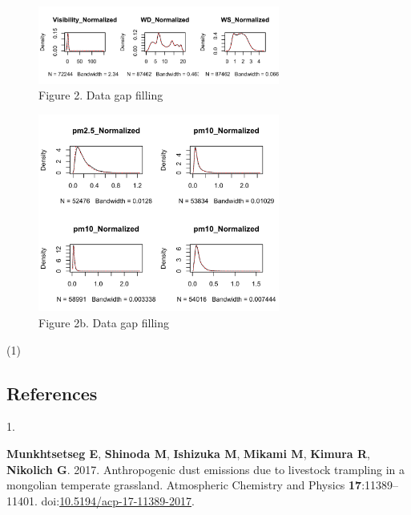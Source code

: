 \documentclass[
  11pt,
]{article}
\newlength{\cslhangindent}
\newlength{\csllabelwidth}
\newenvironment{CSLReferences}[2] %
 {\begin{list}{}{%
  \setlength{\itemindent}{0pt}
  \setlength{\leftmargin}{0pt}
  \setlength{\parsep}{0pt}
  \ifodd #1
   \setlength{\leftmargin}{\cslhangindent}
   \setlength{\itemindent}{-1\cslhangindent}
  \fi
  \setlength{\itemsep}{#2\baselineskip}}}
 {\end{list}}
\newcommand{\CSLLeftMargin}[1]{\parbox[t]{\csllabelwidth}{\strut#1\strut}}
\newcommand{\CSLRightInline}[1]{\parbox[t]{\linewidth - \csllabelwidth}{\strut#1\strut}}
\begin{document}
\newpage

\begin{figure}
\centering
\includegraphics[width=3.125in,height=\textheight,keepaspectratio]{images/figure_2b.png}
\caption{Figure 2. Data gap filling}
\end{figure}

\begin{figure}
\centering
\includegraphics[width=3.125in,height=\textheight,keepaspectratio]{images/figure_2c.png}
\caption{Figure 2b. Data gap filling}
\end{figure}

(1)

\newpage

\subsection*{References}\label{references}

\label{refs}
\begin{CSLReferences}{0}{1}
\CSLLeftMargin{1. }%
\CSLRightInline{\textbf{Munkhtsetseg E}, \textbf{Shinoda M},
\textbf{Ishizuka M}, \textbf{Mikami M}, \textbf{Kimura R},
\textbf{Nikolich G}. 2017. Anthropogenic dust emissions due to livestock
trampling in a mongolian temperate grassland. Atmospheric Chemistry and
Physics \textbf{17}:11389--11401.
doi:\href{https://doi.org/10.5194/acp-17-11389-2017}{10.5194/acp-17-11389-2017}.}

\end{CSLReferences}
\end{document}
